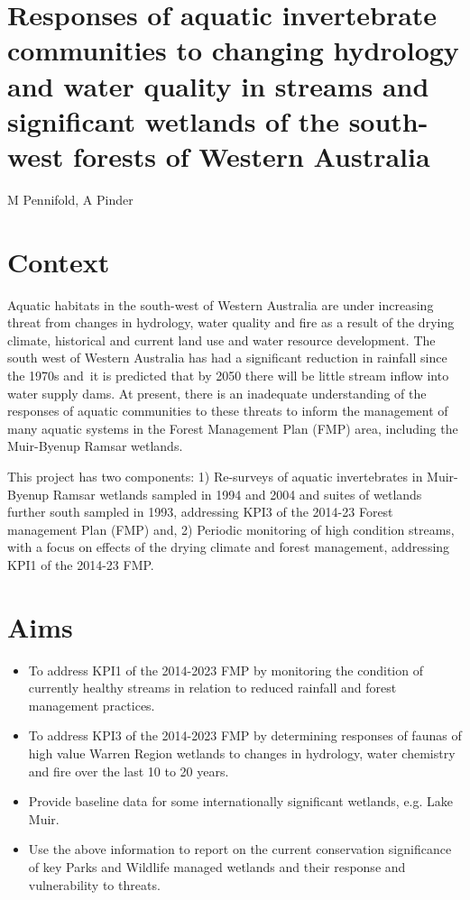 \documentclass[version=last,
    paper=a4, %
    10pt, %
    usenames,
    dvipsnames,
    oneside, %
    headings=openany, %
    DIV=15 %
]{scrbook}
\begin{document}
\section*{Responses of aquatic invertebrate communities to changing hydrology and
water quality in streams and significant wetlands of the south-west
forests of Western Australia
}

M Pennifold, A Pinder



\section*{Context}

Aquatic habitats in the south-west of Western Australia are under
increasing threat from changes in hydrology, water quality and fire as a
result of the drying climate, historical and current land use and water
resource development. The south west of Western Australia has had a
significant reduction in rainfall since the 1970s and~it is predicted
that by 2050 there will be little stream inflow into water supply dams.
At present, there is an inadequate understanding of the responses of
aquatic communities to these threats to inform the management of many
aquatic systems in the Forest Management Plan (FMP) area, including the
Muir-Byenup Ramsar wetlands.~

This project has two components: 1) Re-surveys of aquatic invertebrates
in Muir-Byenup Ramsar wetlands sampled in 1994 and 2004 and suites of
wetlands further south sampled in 1993, addressing KPI3 of the 2014-23
Forest management Plan (FMP) and, 2) Periodic monitoring of high
condition streams, with a focus on effects of the drying climate and
forest management, addressing KPI1 of the 2014-23 FMP.




\section*{Aims}

\begin{itemize}
\itemsep1pt\parskip0pt
\item
  To address KPI1 of the 2014-2023 FMP by monitoring the condition of
  currently healthy streams in relation to reduced rainfall and forest
  management practices.
\item
  To address KPI3 of the 2014-2023 FMP by determining responses of
  faunas of high value Warren Region wetlands to changes in hydrology,
  water chemistry and fire over the last 10 to 20 years.
\item
  Provide baseline data for some internationally significant wetlands,
  e.g. Lake Muir.
\item
  Use the above information to report on the current conservation
  significance of key Parks and Wildlife managed wetlands and their
  response and vulnerability to threats.
\end{itemize}
\end{document}
